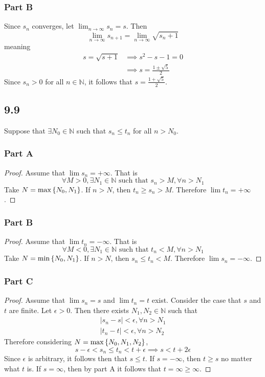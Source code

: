 \documentclass[12pt,titlepage]{extarticle}
\begin{document}
\subsubsection*{Part B}
Since $s_n$ converges, let $\lim_{n\to \infty} s_n = s$. Then
\[
    \lim_{n\to \infty} s_{n+1} = \lim_{n \to \infty} \sqrt{s_n + 1}
\]
meaning
\begin{align*}
    s = \sqrt{s + 1} &\implies s^2 - s - 1 = 0 \\
                     &\implies s = \frac{1 \pm \sqrt{5}}{2}
\end{align*}
Since $s_n > 0$ for all $n \in \mathbb{N}$, it follows that $s = \frac{1 + \sqrt{5}}{2}$.

\subsection*{9.9}
Suppose that $\exists N_0 \in \mathbb{N}$ such that $s_n \leq t_n$ for all $n > N_0$.

\subsubsection*{Part A}
\begin{proof}
    Assume that $\lim s_n = +\infty$. That is
    \[
        \forall M > 0, \exists N_1 \in \mathbb{N} \text{ such that } s_n > M, \forall n > N_1
    \]
    Take $N = \max\qty{N_0, N_1}$. If $n > N$, then $t_n \geq s_n > M$. Therefore $\lim t_n = + \infty$.
\end{proof}

\subsubsection*{Part B}
\begin{proof}
    Assume that $\lim t_n = -\infty$. That is
    \[
        \forall M < 0, \exists N_1 \in \mathbb{N} \text{ such that } t_n < M, \forall n > N_1
    \]
    Take $N = \min\qty{N_0, N_1}$. If $n > N$, then $s_n \leq t_n < M$. Therefore $\lim s_n = - \infty$.
\end{proof}

\subsubsection*{Part C}
\begin{proof}
    Assume that $\lim s_n = s$ and $\lim t_n = t$ exist. Consider the case that $s$ and $t$ are finite. Let $\epsilon > 0$. Then there exists $N_1, N_2 \in \mathbb{N}$ such that
    \begin{align*}
        |s_n - s| < \epsilon, \forall n > N_1 \\
        |t_n - t| < \epsilon, \forall n > N_2
    \end{align*}
    Therefore considering $N = \max\qty{N_0, N_1, N_2}$,
    \[
        s - \epsilon < s_n \leq t_n < t + \epsilon \implies s < t + 2\epsilon
    \]
    Since $\epsilon$ is arbitrary, it follows then that $s \leq t$. If $s = -\infty$, then $t \geq s$ no matter what $t$ is. If $s = \infty$, then by part A it follows that $t = \infty \geq \infty$.
\end{proof}
\end{document}
